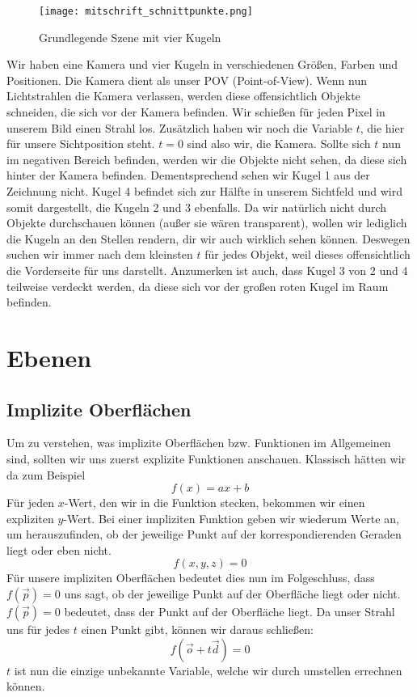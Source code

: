 \documentclass[tog]{acmsiggraph}
\begin{document}
\begin{figure}[ht]
  \centering
	\texttt{[image: mitschrift\_schnittpunkte.png]}
	\caption{Grundlegende Szene mit vier Kugeln}
  \label{fig:base_scene}
\end{figure}
Wir haben eine Kamera und vier Kugeln in verschiedenen Größen, Farben und Positionen. Die Kamera dient als unser POV (Point-of-View). Wenn nun Lichtstrahlen die Kamera verlassen, werden diese offensichtlich Objekte schneiden, die sich vor der Kamera befinden. Wir schießen für jeden Pixel in unserem Bild einen Strahl los. Zusätzlich haben wir noch die Variable $t$, die hier für unsere Sichtposition steht. $t = 0$ sind also wir, die Kamera. Sollte sich $t$ nun im negativen Bereich befinden, werden wir die Objekte nicht sehen, da diese sich hinter der Kamera befinden. Dementsprechend sehen wir Kugel 1 aus der Zeichnung nicht. Kugel 4 befindet sich zur Hälfte in unserem Sichtfeld und wird somit dargestellt, die Kugeln 2 und 3 ebenfalls. Da wir natürlich nicht durch Objekte durchschauen können (außer sie wären transparent), wollen wir lediglich die Kugeln an den Stellen rendern, dir wir auch wirklich sehen können. Deswegen suchen wir immer nach dem kleinsten $t$ für jedes Objekt, weil dieses offensichtlich die Vorderseite für uns darstellt. Anzumerken ist auch, dass Kugel 3 von 2 und 4 teilweise verdeckt werden, da diese sich vor der großen roten Kugel im Raum befinden.

\section{Ebenen}
\subsection{Implizite Oberflächen}
Um zu verstehen, was implizite Oberflächen bzw. Funktionen im Allgemeinen sind, sollten wir uns zuerst explizite Funktionen anschauen. Klassisch hätten wir da zum Beispiel $$f(x) = ax +b$$ Für jeden $x$-Wert, den wir in die Funktion stecken, bekommen wir einen expliziten $y$-Wert.\newline
Bei einer impliziten Funktion geben wir wiederum Werte an, um herauszufinden, ob der jeweilige Punkt auf der korrespondierenden Geraden liegt oder eben nicht. 
$$f(x,y,z) = 0$$
Für unsere impliziten Oberflächen bedeutet dies nun im Folgeschluss, dass $f(\vec{p}) = 0$ uns sagt, ob der jeweilige Punkt auf der Oberfläche liegt oder nicht. $f(\vec{p}) = 0$ bedeutet, dass der Punkt auf der Oberfläche liegt. Da unser Strahl uns für jedes $t$ einen Punkt gibt, können wir daraus schließen:
$$f(\vec{o} + t\vec{d}) = 0$$ $t$ ist nun die einzige unbekannte Variable, welche wir durch umstellen errechnen können. 
\end{document}
